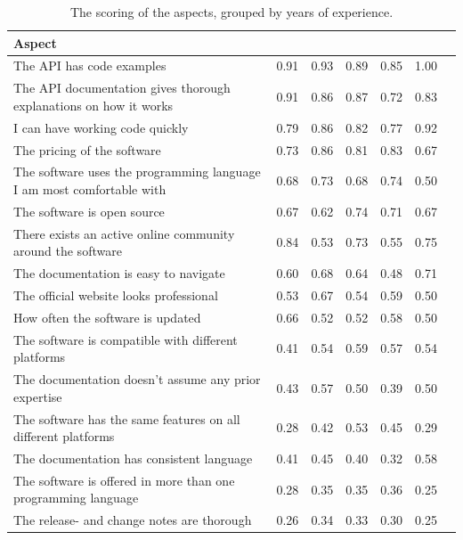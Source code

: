 \documentclass{cslthse-msc}
\begin{document}
    \begin{table}[H]
        \centering
        \caption{The scoring of the aspects, grouped by years of experience.}
        \label{tab:exp}
        \begin{tabularx}{\columnwidth}{X|c|c|c|c|c|c}
            \textbf{Aspect}	&\textbf{\rotatebox{90}{	$<5$ years	}}&\textbf{\rotatebox{90}{	$5-10$ years	}}&\textbf{\rotatebox{90}{	$10-15$ years	}}&\textbf{\rotatebox{90}{	$15-25$ years	}}&\textbf{\rotatebox{90}{	$25+$ years}}	\\ \hline
            The API has code examples	&	0.91	&	0.93	&	0.89	&	0.85	&	1.00	\\ \hline
            The API documentation gives thorough explanations on how it works	&	0.91	&	0.86	&	0.87	&	0.72	&	0.83	\\ \hline
            I can have working code quickly	&	0.79	&	0.86	&	0.82	&	0.77	&	0.92	\\ \hline
            The pricing of the software	&	0.73	&	0.86	&	0.81	&	0.83	&	0.67	\\ \hline
            The software uses the programming language I am most comfortable with	&	0.68	&	0.73	&	0.68	&	0.74	&	0.50	\\ \hline
            The software is open source	&	0.67	&	0.62	&	0.74	&	0.71	&	0.67	\\ \hline
            There exists an active online community around the software	&	0.84	&	0.53	&	0.73	&	0.55	&	0.75	\\ \hline
            The documentation is easy to navigate	&	0.60	&	0.68	&	0.64	&	0.48	&	0.71	\\ \hline
            The official website looks professional	&	0.53	&	0.67	&	0.54	&	0.59	&	0.50	\\ \hline
            How often the software is updated	&	0.66	&	0.52	&	0.52	&	0.58	&	0.50	\\ \hline
            The software is compatible with different platforms	&	0.41	&	0.54	&	0.59	&	0.57	&	0.54	\\ \hline
            The documentation doesn't assume any prior expertise	&	0.43	&	0.57	&	0.50	&	0.39	&	0.50	\\ \hline
            The software has the same features on all different platforms	&	0.28	&	0.42	&	0.53	&	0.45	&	0.29	\\ \hline
            The documentation has consistent language	&	0.41	&	0.45	&	0.40	&	0.32	&	0.58	\\ \hline
            The software is offered in more than one programming language	&	0.28	&	0.35	&	0.35	&	0.36	&	0.25	\\ \hline
            The release- and change notes are thorough	&	0.26	&	0.34	&	0.33	&	0.30	&	0.25	\\ \hline
        \end{tabularx}
    \end{table}
\end{document}
